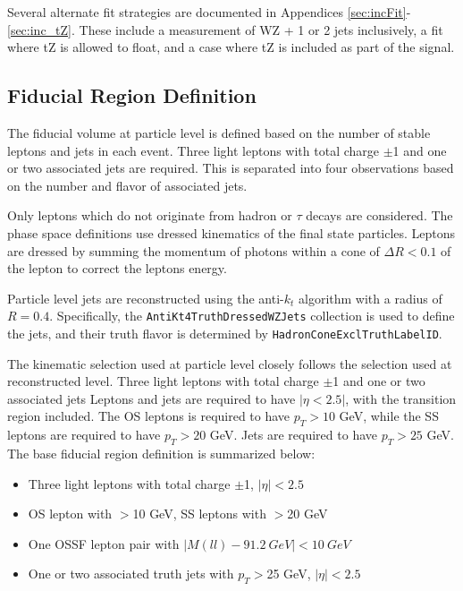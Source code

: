 Several alternate fit strategies are documented in Appendices \ref{sec:incFit}-\ref{sec:inc_tZ}. These include a measurement of WZ + 1 or 2 jets inclusively, a fit where tZ is allowed to float, and a case where tZ is included as part of the signal.

\subsection{Fiducial Region Definition}
\label{sec:fid}

The fiducial volume at particle level is defined based on the number of stable leptons and jets in each event. Three light leptons with total charge $\pm$1 and one or two associated jets are required. This is separated into four observations based on the number and flavor of associated jets.

Only leptons which do not originate from hadron or $\tau$ decays are considered. The phase space definitions use dressed kinematics of the final state particles. Leptons are dressed by summing the momentum of photons within a cone of $\Delta R < 0.1$ of the lepton to correct the leptons energy. 

Particle level jets are reconstructed using the anti-$k_t$ algorithm with a radius of $R=0.4$. Specifically, the \verb!AntiKt4TruthDressedWZJets! collection is used to define the jets, and their truth flavor is determined by \verb!HadronConeExclTruthLabelID!. 

The kinematic selection used at particle level closely follows the selection used at reconstructed level. Three light leptons with total charge $\pm$1 and one or two associated jets  Leptons and jets are required to have $|\eta < 2.5|$, with the transition region included. The OS leptons is required to have $p_T > 10$ GeV, while the SS leptons are required to have $p_T > 20$ GeV. Jets are required to have $p_T > 25$ GeV. The base fiducial region definition is summarized below:

\begin{itemize}
\item Three light leptons with total charge $\pm$1, $|\eta| < 2.5$
\item OS lepton with \pt$>$10 GeV, SS leptons with \pt$>$20 GeV
\item One OSSF lepton pair with $|M(ll)-91.2\ GeV| < 10\ GeV$
\item One or two associated truth jets with $p_T >$25 GeV, $|\eta| < 2.5$
\end{itemize}

